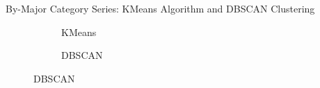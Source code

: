 \documentclass[12pt]{beamer}
\begin{document}
        \begin{frame}{By-Major Category Series: KMeans Algorithm and DBSCAN Clustering}
            \begin{figure}
                \centering
                \begin{subfigure}{0.30\textwidth}
                    \caption{KMeans}
                \end{subfigure}
                \begin{subfigure}{0.30\textwidth}
                    \caption{DBSCAN}
                \end{subfigure}
            \end{figure}
        \end{frame}
\end{document}
